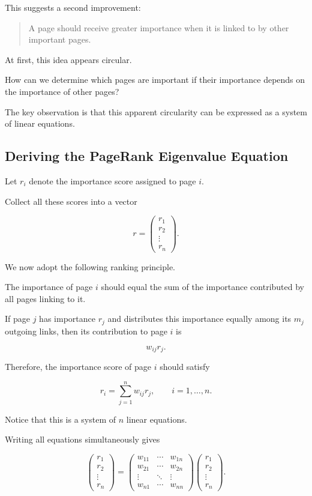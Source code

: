 \documentclass[11pt,a4paper]{article}
\theoremstyle{definition}
\theoremstyle{remark}
\begin{document}
This suggests a second
improvement:

\begin{quote}
A page should receive
greater importance when
it is linked to by
other important pages.
\end{quote}

At first, this idea
appears circular.

How can we determine
which pages are important
if their importance depends
on the importance of
other pages?

The key observation is
that this apparent
circularity can be
expressed as a system
of linear equations.


\subsection{Deriving the PageRank Eigenvalue Equation}

Let $r_i$ denote the
importance score assigned
to page $i$.

Collect all these scores
into a vector

\[
r=
\begin{pmatrix}
r_1\\
r_2\\
\vdots\\
r_n
\end{pmatrix}.
\]

We now adopt the following
ranking principle.

The importance of page $i$
should equal the sum of
the importance contributed
by all pages linking to it.

If page $j$ has importance
$r_j$ and distributes
this importance equally
among its $m_j$ outgoing
links, then its contribution
to page $i$ is

\[
w_{ij}r_j.
\]

Therefore, the importance
score of page $i$
should satisfy

\begin{equation}
r_i
=
\sum_{j=1}^{n}w_{ij}r_j,
\qquad i=1,\ldots,n.
\label{eq:pagerank_component_equation}
\end{equation}

Notice that this is
a system of $n$
linear equations.

Writing all equations
simultaneously gives

\[
\begin{pmatrix}
r_1\\
r_2\\
\vdots\\
r_n
\end{pmatrix}
=
\begin{pmatrix}
w_{11}&\cdots&w_{1n}\\
w_{21}&\cdots&w_{2n}\\
\vdots&\ddots&\vdots\\
w_{n1}&\cdots&w_{nn}
\end{pmatrix}
\begin{pmatrix}
r_1\\
r_2\\
\vdots\\
r_n
\end{pmatrix}.
\]
\end{document}
